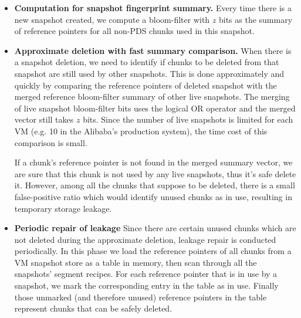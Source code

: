 \begin{itemize}
\item {\bf Computation for snapshot fingerprint summary.}
Every time there is a new snapshot created,
we compute a bloom-filter with $z$ bits as the summary of reference pointers for all non-PDS chunks used 
in this snapshot. 



\item {\bf Approximate deletion with fast summary comparison.}
When there is a snapshot deletion,  
we need to identify if  chunks to be deleted from that snapshot
are still used by other snapshots. 
This is done approximately and quickly by comparing the 
reference pointers of deleted snapshot with
the merged reference bloom-filter summary of other live snapshots.
The merging of live snapshot bloom-filter bits uses the logical OR operator 
and the merged vector still takes $z$ bits.
Since the number of live snapshots is limited for 
each VM (e.g. 10 in the Alibaba's production system), 
the time cost of this comparison is small.

If a chunk's reference pointer is not found in the merged summary vector, we are sure that
this chunk is not used by any live snapshots, thus it's safe delete it. 
However, among all the chunks that suppose to be deleted, 
there is a small false-positive ratio which
would identify unused chunks as in use, resulting in temporary storage leakage.


\item {\bf Periodic repair of leakage}
Since there are certain unused chunks which are not deleted during
the approximate deletion, leakage repair is conducted periodically.
In this phase we load the reference pointers of all chunks from a VM snapshot store as a table in memory,
then scan through all the snapshots' segment recipes. For each reference pointer that is in use by a snapshot,
we mark the corresponding entry in the table as in use. Finally those unmarked (and therefore unused) reference pointers in the
table represent chunks that can be safely deleted.


\end{itemize}
